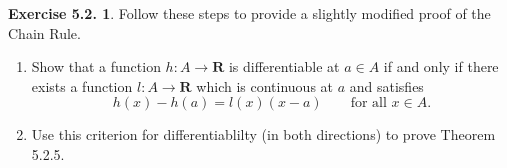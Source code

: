 \documentclass[12pt]{article}
\theoremstyle{definition}
\theoremstyle{exercise}
\newtheorem{exercise}{Exercise 5.2.}
\theoremstyle{solution}
\newcommand{\R}{\mathbf{R}}
\begin{document}
\begin{exercise}
\label{ex:4}
    Follow these steps to provide a slightly modified proof of the Chain Rule.
    \begin{enumerate}
        \item Show that a function \( h : A \to \R \) is differentiable at \( a \in A \) if and only if there exists a function \( l : A \to \R \) which is continuous at \( a \) and satisfies
        \[
            h(x) - h(a) = l(x) (x - a) \qquad \text{for all } x \in A.
        \]

        \item Use this criterion for differentiablilty (in both directions) to prove Theorem 5.2.5.
    \end{enumerate}
\end{exercise}
\end{document}
